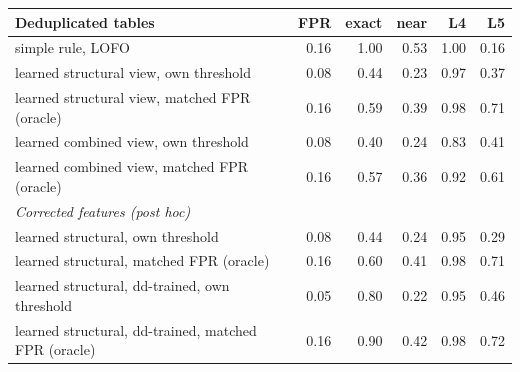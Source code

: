 \begin{tabular}{lrrrrr}\toprule
Deduplicated tables & FPR & exact & near & L4 & L5\\\midrule
simple rule, LOFO & 0.16 & 1.00 & 0.53 & 1.00 & 0.16\\
learned structural view, own threshold & 0.08 & 0.44 & 0.23 & 0.97 & 0.37\\
learned structural view, matched FPR (oracle) & 0.16 & 0.59 & 0.39 & 0.98 & 0.71\\
learned combined view, own threshold & 0.08 & 0.40 & 0.24 & 0.83 & 0.41\\
learned combined view, matched FPR (oracle) & 0.16 & 0.57 & 0.36 & 0.92 & 0.61\\
\midrule\multicolumn{6}{l}{\emph{Corrected features (post hoc)}}\\
learned structural, own threshold & 0.08 & 0.44 & 0.24 & 0.95 & 0.29\\
learned structural, matched FPR (oracle) & 0.16 & 0.60 & 0.41 & 0.98 & 0.71\\
learned structural, dd-trained, own threshold & 0.05 & 0.80 & 0.22 & 0.95 & 0.46\\
learned structural, dd-trained, matched FPR (oracle) & 0.16 & 0.90 & 0.42 & 0.98 & 0.72\\
\bottomrule\end{tabular}
